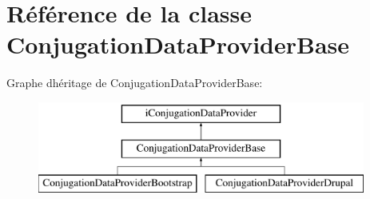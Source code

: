 \hypertarget{classConjugationDataProviderBase}{}\section{Référence de la classe Conjugation\+Data\+Provider\+Base}
\label{classConjugationDataProviderBase}
Graphe d\textquotesingle{}héritage de Conjugation\+Data\+Provider\+Base\+:\begin{figure}[H]
\begin{center}
\leavevmode
\includegraphics[height=3.000000cm]{classConjugationDataProviderBase}
\end{center}
\end{figure}
